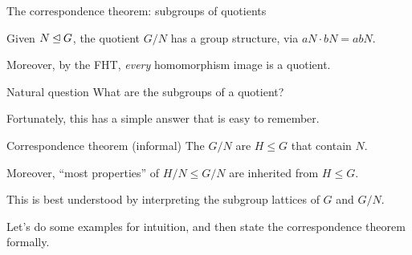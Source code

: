 \documentclass[8pt]{beamer}
\newcommand{\Pause}{}      %
\begin{document}
\begin{frame}{The correspondence theorem: subgroups of quotients}
  
  Given $N\unlhd G$, the quotient $G/N$ has a group structure, via
  $aN\cdot bN=abN$. \medskip\Pause
  
  Moreover, by the FHT, \emph{every} homomorphism image is a
  quotient. \smallskip\Pause
  
  \begin{exampleblock}{Natural question}
    What are the subgroups of a quotient?
  \end{exampleblock}
  
  \smallskip\Pause
  
  Fortunately, this has a simple answer that is easy to remember.
  
  \smallskip\Pause
  
  \begin{alertblock}{Correspondence theorem (informal)}
    The  $G/N$ are  $H\leq G$ that contain $N$. \medskip\Pause
    
    Moreover, ``most properties'' of $H/N\leq G/N$ are inherited from $H\leq G$.
  \end{alertblock}
  
  \smallskip\Pause
  
  This is best understood by interpreting the subgroup lattices of $G$
  and $G/N$.
  
  \medskip\Pause
  
  Let's do some examples for intuition, and then state the
  correspondence theorem formally.
  
\end{frame}

\end{document}
